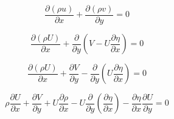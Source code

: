 
\begin{equation} 
\frac{\partial (\rho u)}{\partial x}
+
\frac{\partial (\rho v)}{\partial y}
=
0
\end{equation} 

\begin{equation} 
\frac{\partial (\rho U)}{\partial x}
+
\frac{\partial }{\partial y}
\left(
    V
    -
    U
    \frac{\partial \eta}{\partial x }
\right)
=
0
\end{equation} 

\begin{equation} 
\frac{\partial (\rho U)}{\partial x}
+
\frac{\partial V}{\partial y}
-
\frac{\partial }{\partial y}
\left(
    U
    \frac{\partial \eta}{\partial x }
\right)
=
0
\end{equation} 

\begin{equation} 
\rho
\frac{\partial  U}{\partial x}
+
\frac{\partial V}{\partial y}
+
U
\frac{\partial \rho }{\partial x}
-
U
\frac{\partial }{\partial y}
\left(
    \frac{\partial \eta}{\partial x }
\right)
-
\frac{\partial \eta}{\partial x }
\frac{\partial U}{\partial y}
=
0
\end{equation} 

